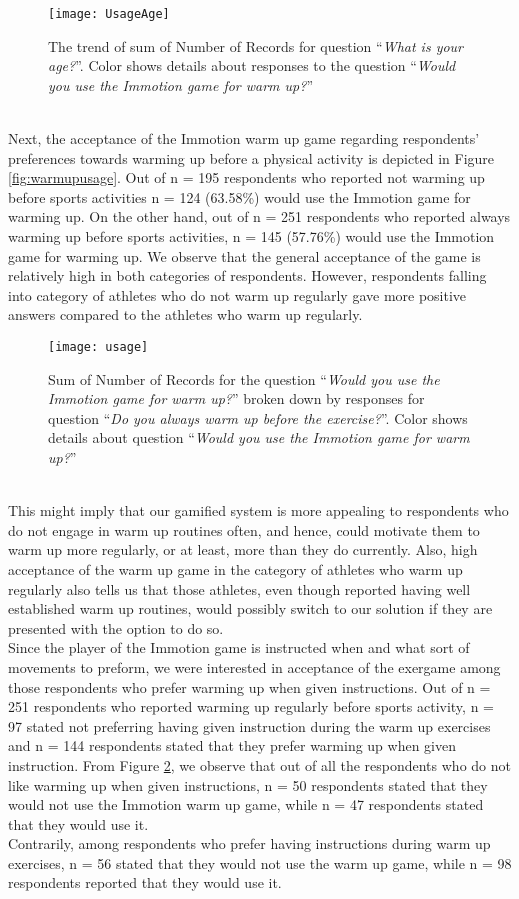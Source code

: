 \begin{figure}[h]
    \centering
    \texttt{[image: UsageAge]}
    \caption{The trend of sum of Number of Records for question ``\textit{What is your age?}''. Color shows details about responses to the question ``\textit{Would you use the Immotion game for warm up?}''}
    \label{fig:UsageAge}
\end{figure}\\
Next, the acceptance of the Immotion warm up game regarding respondents' preferences towards warming up before a physical activity is depicted in Figure \ref{fig:warmupusage}. Out of n = 195 respondents who reported not warming up before sports activities n = 124 (63.58\%) would use the Immotion game for warming up. On the other hand, out of n = 251 respondents who reported always warming up before sports activities, n = 145 (57.76\%) would use the Immotion game for warming up. We observe that the general acceptance of the game is relatively high in both categories of respondents. However, respondents falling into category of athletes who do not warm up regularly gave more positive answers compared to the athletes who warm up regularly.\\
\begin{figure}[h]
    \centering
    \texttt{[image: usage]}
    \caption{Sum of Number of Records for the question ``\textit{Would you use the Immotion game for warm up?}'' broken down by responses for question ``\textit{Do you always warm up before the exercise?}''. Color shows details about question ``\textit{Would you use the Immotion game for warm up?}''}
    \label{fig:usage}
\end{figure}\\
This might imply that our gamified system is more appealing to respondents who do not engage in warm up routines often, and hence, could motivate them to warm up more regularly, or at least, more than they do currently. Also, high acceptance of the warm up game in the category of athletes who warm up regularly also tells us that those athletes, even though reported having well established warm up routines, would possibly switch to our solution if they are presented with the option to do so. 
\\Since the player of the Immotion game is instructed when and what sort of movements to preform, we were interested in acceptance of the exergame among those respondents who prefer warming up when given instructions. Out of n = 251 respondents who reported warming up regularly before sports activity, n = 97 stated not preferring having given instruction during the warm up exercises and n = 144 respondents stated that they prefer warming up when given instruction. From Figure  \ref{fig:usage}, we observe that out of all the respondents who do not like warming up when given instructions, n = 50 respondents stated that they would not use the Immotion warm up game, while n = 47 respondents stated that they would use it. \\Contrarily, among respondents who prefer having instructions during warm up exercises, n = 56 stated that they would not use the warm up game, while n = 98 respondents reported that they would use it.\\

